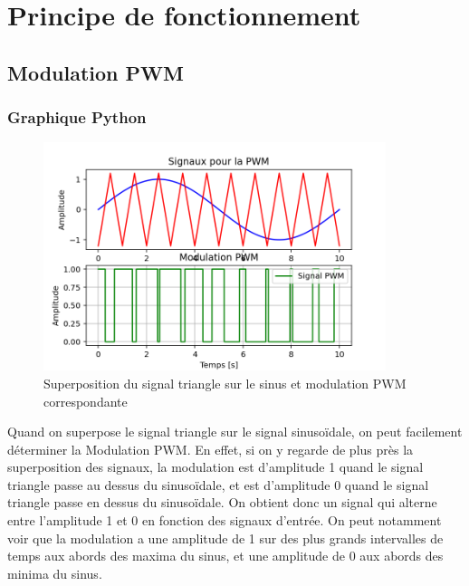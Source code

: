 \documentclass[a4paper,12pt,oneside]{report}	%
\begin{document}
\umonsCoverPage 

\tableofcontents
\newpage

\chapter{Principe de fonctionnement}
    \section{Modulation PWM}
        \subsection{Graphique Python}
            \begin{figure}[h!]
                \centering
                \includegraphics[width=10cm]{images/1.1.1 - PWM btw sin and tri.png}
                \caption{Superposition du signal triangle sur le sinus et modulation PWM correspondante}
                \label{fig:pwm_modulation}
            \end{figure}
            
            Quand on superpose le signal triangle sur le signal sinusoïdale, on peut facilement déterminer la Modulation PWM. En effet, si on y regarde de plus près la superposition des signaux, la modulation est d'amplitude 1 quand le signal triangle passe au dessus du sinusoïdale, et est d'amplitude 0 quand le signal triangle passe en dessus du sinusoïdale. On obtient donc un signal qui alterne entre l'amplitude 1 et 0 en fonction des signaux d'entrée. On peut notamment voir que la modulation a une amplitude de 1 sur des plus grands intervalles de temps aux abords des maxima du sinus, et une amplitude de 0 aux abords des minima du sinus.
\end{document}
